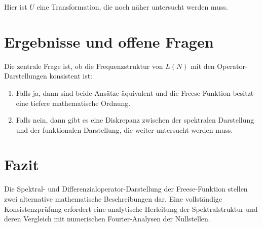 \documentclass[a4paper,12pt]{article}
\begin{document}
Hier ist \( U \) eine Transformation, die noch näher untersucht werden muss.

\section{Ergebnisse und offene Fragen}
Die zentrale Frage ist, ob die Frequenzstruktur von \( L(N) \) mit den Operator-Darstellungen konsistent ist:

\begin{enumerate}
    \item Falls ja, dann sind beide Ansätze äquivalent und die Freese-Funktion besitzt eine tiefere mathematische Ordnung.
    \item Falls nein, dann gibt es eine Diskrepanz zwischen der spektralen Darstellung und der funktionalen Darstellung, die weiter untersucht werden muss.
\end{enumerate}

\section{Fazit}
Die Spektral- und Differenzialoperator-Darstellung der Freese-Funktion stellen zwei alternative mathematische Beschreibungen dar. Eine vollständige Konsistenzprüfung erfordert eine analytische Herleitung der Spektralstruktur und deren Vergleich mit numerischen Fourier-Analysen der Nullstellen.
\end{document}
